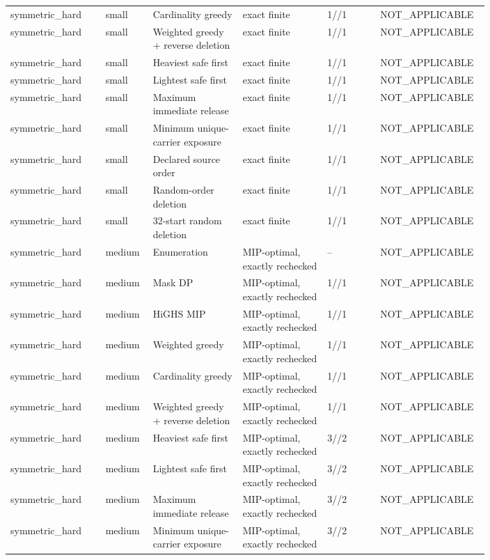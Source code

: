 {\begin{longtable}{p{0.18\linewidth}p{0.07\linewidth}p{0.17\linewidth}p{0.16\linewidth}p{0.10\linewidth}p{0.12\linewidth}}
symmetric\_hard & small & Cardinality greedy & exact finite & 1//1 & NOT\_APPLICABLE \\
symmetric\_hard & small & Weighted greedy + reverse deletion & exact finite & 1//1 & NOT\_APPLICABLE \\
symmetric\_hard & small & Heaviest safe first & exact finite & 1//1 & NOT\_APPLICABLE \\
symmetric\_hard & small & Lightest safe first & exact finite & 1//1 & NOT\_APPLICABLE \\
symmetric\_hard & small & Maximum immediate release & exact finite & 1//1 & NOT\_APPLICABLE \\
symmetric\_hard & small & Minimum unique-carrier exposure & exact finite & 1//1 & NOT\_APPLICABLE \\
symmetric\_hard & small & Declared source order & exact finite & 1//1 & NOT\_APPLICABLE \\
symmetric\_hard & small & Random-order deletion & exact finite & 1//1 & NOT\_APPLICABLE \\
symmetric\_hard & small & 32-start random deletion & exact finite & 1//1 & NOT\_APPLICABLE \\
symmetric\_hard & medium & Enumeration & MIP-optimal, exactly rechecked & -- & NOT\_APPLICABLE \\
symmetric\_hard & medium & Mask DP & MIP-optimal, exactly rechecked & 1//1 & NOT\_APPLICABLE \\
symmetric\_hard & medium & HiGHS MIP & MIP-optimal, exactly rechecked & 1//1 & NOT\_APPLICABLE \\
symmetric\_hard & medium & Weighted greedy & MIP-optimal, exactly rechecked & 1//1 & NOT\_APPLICABLE \\
symmetric\_hard & medium & Cardinality greedy & MIP-optimal, exactly rechecked & 1//1 & NOT\_APPLICABLE \\
symmetric\_hard & medium & Weighted greedy + reverse deletion & MIP-optimal, exactly rechecked & 1//1 & NOT\_APPLICABLE \\
symmetric\_hard & medium & Heaviest safe first & MIP-optimal, exactly rechecked & 3//2 & NOT\_APPLICABLE \\
symmetric\_hard & medium & Lightest safe first & MIP-optimal, exactly rechecked & 3//2 & NOT\_APPLICABLE \\
symmetric\_hard & medium & Maximum immediate release & MIP-optimal, exactly rechecked & 3//2 & NOT\_APPLICABLE \\
symmetric\_hard & medium & Minimum unique-carrier exposure & MIP-optimal, exactly rechecked & 3//2 & NOT\_APPLICABLE \\

\end{longtable}}
